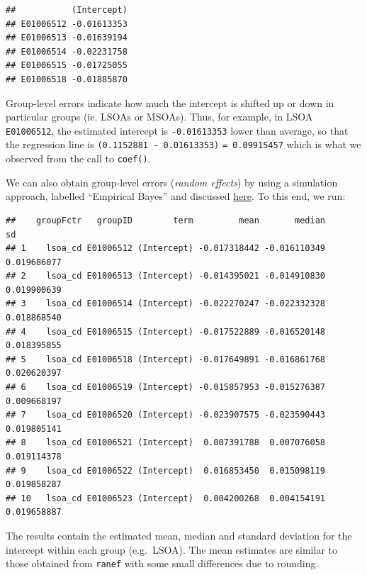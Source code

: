 \documentclass[]{book}
\newenvironment{Shaded}{\begin{snugshade}}{\end{snugshade}}
\newcommand{\KeywordTok}[1]{\textcolor[rgb]{0.13,0.29,0.53}{\textbf{#1}}}
\newcommand{\DecValTok}[1]{\textcolor[rgb]{0.00,0.00,0.81}{#1}}
\newcommand{\StringTok}[1]{\textcolor[rgb]{0.31,0.60,0.02}{#1}}
\newcommand{\CommentTok}[1]{\textcolor[rgb]{0.56,0.35,0.01}{\textit{#1}}}
\newcommand{\OperatorTok}[1]{\textcolor[rgb]{0.81,0.36,0.00}{\textbf{#1}}}
\newcommand{\NormalTok}[1]{#1}
\begin{document}
\begin{verbatim}
##           (Intercept)
## E01006512 -0.01613353
## E01006513 -0.01639194
## E01006514 -0.02231758
## E01006515 -0.01725055
## E01006518 -0.01885870
\end{verbatim}

Group-level errors indicate how much the intercept is shifted up or down
in particular groups (ie. LSOAs or MSOAs). Thus, for example, in LSOA
\texttt{E01006512}, the estimated intercept is \texttt{-0.01613353}
lower than average, so that the regression line is
\texttt{(0.1152881\ -\ 0.01613353)} \texttt{=\ 0.09915457} which is what
we observed from the call to \texttt{coef()}.

We can also obtain group-level errors (\emph{random effects}) by using a
simulation approach, labelled ``Empirical Bayes'' and discussed
\href{https://stat.ethz.ch/pipermail/r-sig-mixed-models/2009q4/002984.html}{here}.
To this end, we run:

\begin{Shaded}
\end{Shaded}

\begin{verbatim}
##    groupFctr   groupID        term         mean       median          sd
## 1    lsoa_cd E01006512 (Intercept) -0.017318442 -0.016110349 0.019686077
## 2    lsoa_cd E01006513 (Intercept) -0.014395021 -0.014910830 0.019900639
## 3    lsoa_cd E01006514 (Intercept) -0.022270247 -0.022332328 0.018868540
## 4    lsoa_cd E01006515 (Intercept) -0.017522889 -0.016520148 0.018395855
## 5    lsoa_cd E01006518 (Intercept) -0.017649891 -0.016861768 0.020620397
## 6    lsoa_cd E01006519 (Intercept) -0.015857953 -0.015276387 0.009668197
## 7    lsoa_cd E01006520 (Intercept) -0.023907575 -0.023590443 0.019805141
## 8    lsoa_cd E01006521 (Intercept)  0.007391788  0.007076058 0.019114378
## 9    lsoa_cd E01006522 (Intercept)  0.016853450  0.015098119 0.019858287
## 10   lsoa_cd E01006523 (Intercept)  0.004200268  0.004154191 0.019658887
\end{verbatim}

The results contain the estimated mean, median and standard deviation
for the intercept within each group (e.g.~LSOA). The mean estimates are
similar to those obtained from \texttt{ranef} with some small
differences due to rounding.
\end{document}

